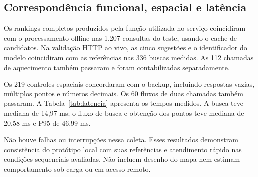 \subsection{Correspondência funcional, espacial e latência}

Os rankings completos produzidos pela função utilizada no serviço coincidiram com o processamento offline nas 1.207 consultas do teste, usando o cache de candidatos. Na validação HTTP ao vivo, as cinco sugestões e o identificador do modelo coincidiram com as referências nas 336 buscas medidas. As 112 chamadas de aquecimento também passaram e foram contabilizadas separadamente.

Os 219 controles espaciais concordaram com o backup, incluindo respostas vazias, múltiplos pontos e números decimais. Os 60 fluxos de duas chamadas também passaram. A Tabela~\ref{tab:latencia} apresenta os tempos medidos. A busca teve mediana de 14,97 ms; o fluxo de busca e obtenção dos pontos teve mediana de 20,58 ms e P95 de 46,99 ms.



Não houve falhas ou interrupções nessa coleta. Esses resultados demonstram consistência do protótipo local com suas referências e atendimento rápido nas condições sequenciais avaliadas. Não incluem desenho do mapa nem estimam comportamento sob carga ou em acesso remoto.
